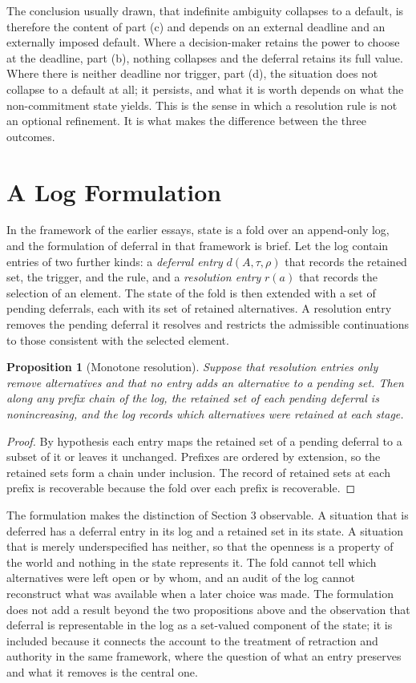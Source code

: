 \documentclass[11pt]{article}
\newtheorem{proposition}{Proposition}
\theoremstyle{remark}
\begin{document}
The conclusion usually drawn, that indefinite ambiguity collapses to a default, is therefore the content of part (c) and depends on an external deadline and an externally imposed default. Where a decision-maker retains the power to choose at the deadline, part (b), nothing collapses and the deferral retains its full value. Where there is neither deadline nor trigger, part (d), the situation does not collapse to a default at all; it persists, and what it is worth depends on what the non-commitment state yields. This is the sense in which a resolution rule is not an optional refinement. It is what makes the difference between the three outcomes.

\section{A Log Formulation}

In the framework of the earlier essays, state is a fold over an append-only log, and the formulation of deferral in that framework is brief. Let the log contain entries of two further kinds: a \emph{deferral entry} $d(A,\tau,\rho)$ that records the retained set, the trigger, and the rule, and a \emph{resolution entry} $r(a)$ that records the selection of an element. The state of the fold is then extended with a set of pending deferrals, each with its set of retained alternatives. A resolution entry removes the pending deferral it resolves and restricts the admissible continuations to those consistent with the selected element.

\begin{proposition}[Monotone resolution]
Suppose that resolution entries only remove alternatives and that no entry adds an alternative to a pending set. Then along any prefix chain of the log, the retained set of each pending deferral is nonincreasing, and the log records which alternatives were retained at each stage.
\end{proposition}

\begin{proof}
By hypothesis each entry maps the retained set of a pending deferral to a subset of it or leaves it unchanged. Prefixes are ordered by extension, so the retained sets form a chain under inclusion. The record of retained sets at each prefix is recoverable because the fold over each prefix is recoverable.
\end{proof}

The formulation makes the distinction of Section 3 observable. A situation that is deferred has a deferral entry in its log and a retained set in its state. A situation that is merely underspecified has neither, so that the openness is a property of the world and nothing in the state represents it. The fold cannot tell which alternatives were left open or by whom, and an audit of the log cannot reconstruct what was available when a later choice was made. The formulation does not add a result beyond the two propositions above and the observation that deferral is representable in the log as a set-valued component of the state; it is included because it connects the account to the treatment of retraction and authority in the same framework, where the question of what an entry preserves and what it removes is the central one.
\end{document}
